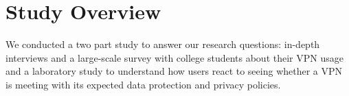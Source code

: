 \section{Study Overview}\label{sec:overview}

We conducted a two part study to answer our research questions:  in-depth interviews and  a large-scale survey with college students about their VPN usage and a laboratory study to understand how users react to seeing whether a VPN is meeting with its expected data protection and privacy policies. 

